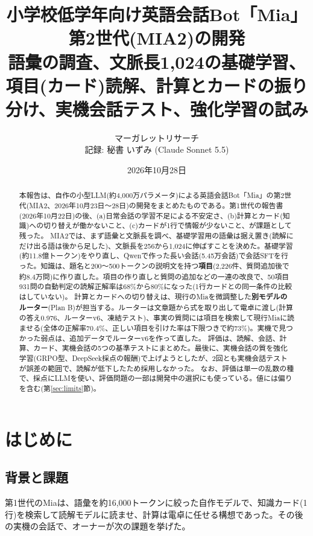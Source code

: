 \documentclass[a4paper,11pt]{article}
\title{\textbf{小学校低学年向け英語会話Bot「Mia」第2世代(MIA2)の開発}\\[1mm]\large 語彙の調査、文脈長1,024の基礎学習、項目(カード)読解、計算とカードの振り分け、実機会話テスト、強化学習の試み}
\author{マーガレットリサーチ\\[1mm]\small 記録: 秘書 いずみ (Claude Sonnet 5.5)}
\date{2026年10月28日}
\begin{document}
\maketitle

\begin{abstract}
本報告は、自作の小型LLM(約4,000万パラメータ)による英語会話Bot「Mia」の第2世代(MIA2、2026年10月23日〜28日)の開発をまとめたものである。第1世代の報告書(2026年10月22日)の後、(a)日常会話の学習不足による不安定さ、(b)計算とカード(知識)への切り替えが働かないこと、(c)カードが1行で情報が少ないこと、が課題として残った。
MIA2では、まず語彙と文脈長を調べ、基礎学習用の語彙は据え置き(読解にだけ出る語は後から足した)、文脈長を256から1,024に伸ばすことを決めた。基礎学習(約11.8億トークン)をやり直し、Qwenで作った長い会話(5.45万会話)で会話SFTを行った。知識は、題名と200〜500トークンの説明文を持つ\textbf{項目}(2,226件、質問追加後で約8.4万問)に作り直した。項目の作り直しと質問の追加などの一連の改良で、50項目931問の自動判定の読解正解率は68\%から80\%になった(1行カードとの同一条件の比較はしていない)。
計算とカードへの切り替えは、現行のMiaを微調整した\textbf{別モデルのルーター}(Plan B)が担当する。ルーターは文章題から式を取り出して電卓に渡し(計算の答え0.976、ルーターv6、凍結テスト)、事実の質問には項目を検索して現行Miaに読ませる(全体の正解率70.4\%、正しい項目を引けた率は下限つきで約73\%)。実機で見つかった弱点は、追加データでルーターv6を作って直した。
評価は、読解、会話、計算、カード、実機会話の5つの基準テストにまとめた。最後に、実機会話の質を強化学習(GRPO型、DeepSeek採点の報酬)で上げようとしたが、2回とも実機会話テストが誤差の範囲で、読解が低下したため採用しなかった。
なお、評価は単一の乱数の種で、採点にLLMを使い、評価問題の一部は開発中の選択にも使っている。値には偏りを含む(第\ref{sec:limits}節)。
\end{abstract}

\section{はじめに}
\subsection{背景と課題}
第1世代のMiaは、語彙を約16,000トークンに絞った自作モデルで、知識カード(1行)を検索して読解モデルに読ませ、計算は電卓に任せる構想であった。その後の実機の会話で、オーナーが次の課題を挙げた。
\end{document}
